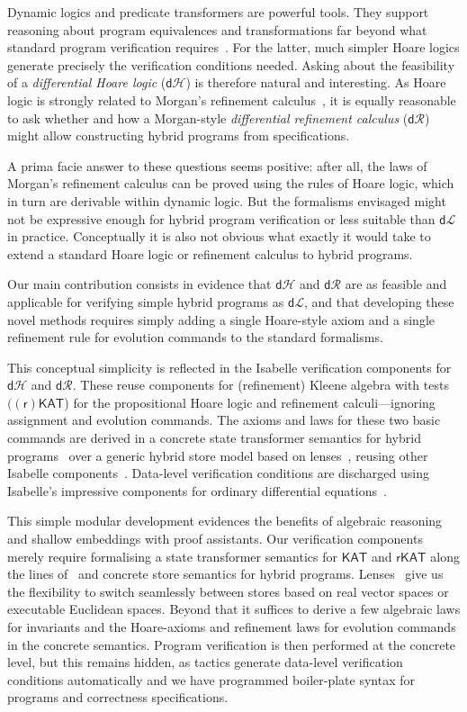 \documentclass[envcountsame,envcountsect]{llncs}
\newcommand{\KAT}{\mathsf{KAT}}
\newcommand{\rKAT}{\mathsf{rKAT}}
\newcommand{\dL}{\mathsf{d}\mathcal{L}}
\newcommand{\dH}{\mathsf{d}\mathcal{H}}
\newcommand{\dR}{\mathsf{d}\mathcal{R}}
\begin{document}
Dynamic logics and predicate transformers are powerful tools. They
support reasoning about program equivalences and transformations
far beyond what standard program verification requires~\cite{BackW98}. For
the latter, much simpler Hoare logics generate precisely the
verification conditions needed.  Asking about the feasibility of a
\emph{differential Hoare logic} ($\dH$) is therefore natural and
interesting.  As Hoare logic is strongly related to Morgan's
refinement calculus~\cite{Morgan94}, it is equally reasonable to
ask whether and how a Morgan-style \emph{differential refinement calculus}
($\dR$) might allow constructing hybrid programs from specifications.

A prima facie answer to these questions seems positive: after all, the
laws of Morgan's refinement calculus can be proved using the rules of
Hoare logic, which in turn are derivable within dynamic logic. But the
formalisms envisaged might not be expressive enough for hybrid program
verification or less suitable than $\dL$ in practice. Conceptually it
is also not obvious what exactly it would take to extend a standard
Hoare logic or refinement calculus to hybrid programs.

Our main contribution consists in evidence that $\dH$ and $\dR$ are as
feasible and applicable for verifying simple hybrid programs as $\dL$,
and that developing these novel methods requires simply adding a
single Hoare-style axiom and a single refinement rule for evolution
commands to the standard formalisms.

This conceptual simplicity is reflected in the Isabelle verification
components for $\dH$ and $\dR$. These reuse components for
(refinement) Kleene algebra with
tests~\cite{Kozen97,ArmstrongGS16,afp:vericomp} $(\mathsf{(r)KAT}$)
for the propositional Hoare logic and refinement calculi---ignoring
assignment and evolution commands. The axioms and laws for these two
basic commands are derived in a concrete state transformer semantics
for hybrid programs~\cite{afp:hybrid} over a generic hybrid
store model based on lenses~\cite{FosterZW16}, reusing other Isabelle
components~\cite{afp:hybrid,Foster18c-Optics,Foster19a-IsabelleUTP}.
Data-level verification conditions are discharged using Isabelle's
impressive components for ordinary differential
equations~\cite{ImmlerH12a}.

This simple modular development evidences the benefits of algebraic
reasoning and shallow embeddings with proof assistants. Our
verification components merely require formalising a state transformer
semantics for $\KAT$ and $\rKAT$ along the lines of~\cite{MuniveS19}
and concrete store semantics for hybrid
programs. Lenses~\cite{FosterZW16} give us the flexibility to switch
seamlessly between stores based on real vector spaces or executable
Euclidean spaces. Beyond that it suffices to derive a few algebraic
laws for invariants and the Hoare-axioms and refinement laws for
evolution commands in the concrete semantics. Program verification is
then performed at the concrete level, but this remains hidden, as
tactics generate data-level verification conditions automatically and
we have programmed boiler-plate syntax for programs and correctness
specifications.
\end{document}
